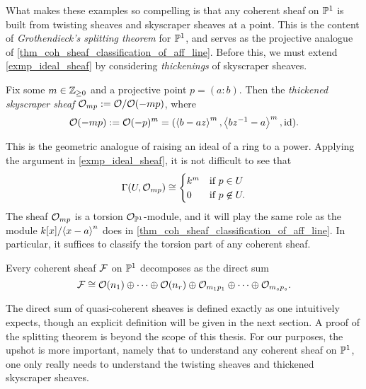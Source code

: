 What makes these examples so compelling is that any coherent sheaf on
$\mathbb{P}^{{1}}$ is built from twisting sheaves and skyscraper sheaves at a point.
This is the content of \emph{Grothendieck's splitting theorem} for
$\mathbb{P}^{{1}}$, and serves as the projective analogue of
\cref{thm_coh_sheaf_classification_of_aff_line}.
Before this, we must extend \cref{exmp_ideal_sheaf} by considering
\emph{thickenings} of skyscraper sheaves.

\begin{definition}
  Fix some $m \in \mathbb{Z}_{\geq 0}$ and a projective point $p = (a : b)$.
  Then the \emph{thickened skyscraper sheaf} $\mathcal{O}_{{mp}} :=
  {\mathcal{O}}\mathopen/{\mathcal{O}({-mp})}$, where
  \[
    \mathcal{O}({-mp}) := \mathcal{O}({-p})^m = (\left\langle {b - az} \right\rangle^m, \left\langle {bz^{-1} - a} \right\rangle^m, \operatorname{id}).
  \]
  \vspace{-24pt}
\end{definition}

This is the geometric analogue of raising an ideal of a ring to a power.
Applying the argument in \cref{exmp_ideal_sheaf}, it is not difficult
to see that
\[
  \Gamma({U}, {\mathcal{O}_{{mp}}}) \cong
  \begin{cases}
    k^m & \text{if } p \in U \\
    0 & \text{if } p \not\in U.
  \end{cases}
\]
The sheaf $\mathcal{O}_{{mp}}$ is a torsion $\mathcal{O}_{{\mathbb{P}^{{1}}}}$-module,
and it will play the same role as the module ${k[x]}\mathopen/{\left\langle {x -
a} \right\rangle^n}$ does in \cref{thm_coh_sheaf_classification_of_aff_line}.
In particular, it suffices to classify the torsion part of any coherent sheaf.

\begin{theorem}
  Every coherent sheaf $\mathcal{F}$ on $\mathbb{P}^{{1}}$ decomposes as the direct sum
  \[
    \mathcal{F} \cong
    \mathcal{O}({n_1}) \oplus \cdots \oplus \mathcal{O}({n_r}) \oplus
    \mathcal{O}_{{m_1 p_1}} \oplus \cdots \oplus \mathcal{O}_{{m_s p_s}}.
  \]
  \vspace{-24pt}
\end{theorem}

The direct sum of quasi-coherent sheaves is defined exactly as one
intuitively expects, though an explicit definition will be given in
the next section.
A proof of the splitting theorem is beyond the scope of this thesis.
For our purposes, the upshot is more important, namely that to
understand any coherent sheaf on $\mathbb{P}^{{1}}$, one only really needs to
understand the twisting sheaves and thickened skyscraper sheaves.
